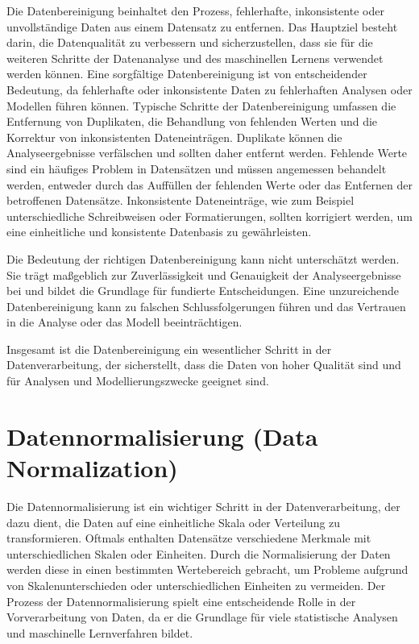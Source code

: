 Die Datenbereinigung beinhaltet den Prozess, fehlerhafte, inkonsistente oder unvollständige Daten aus einem Datensatz zu entfernen.
Das Hauptziel besteht darin, die Datenqualität zu verbessern und sicherzustellen, dass sie für die weiteren Schritte der Datenanalyse und des maschinellen Lernens verwendet werden können.
Eine sorgfältige Datenbereinigung ist von entscheidender Bedeutung, da fehlerhafte oder inkonsistente Daten zu fehlerhaften Analysen oder Modellen führen können.
Typische Schritte der Datenbereinigung umfassen die Entfernung von Duplikaten, die Behandlung von fehlenden Werten und die Korrektur von inkonsistenten Dateneinträgen.
Duplikate können die Analyseergebnisse verfälschen und sollten daher entfernt werden. 
Fehlende Werte sind ein häufiges Problem in Datensätzen und müssen angemessen behandelt werden, entweder durch das Auffüllen der fehlenden Werte oder das Entfernen der betroffenen Datensätze. 
Inkonsistente Dateneinträge, wie zum Beispiel unterschiedliche Schreibweisen oder Formatierungen, sollten korrigiert werden, um eine einheitliche und konsistente Datenbasis zu gewährleisten.  

Die Bedeutung der richtigen Datenbereinigung kann nicht unterschätzt werden. 
Sie trägt maßgeblich zur Zuverlässigkeit und Genauigkeit der Analyseergebnisse bei und bildet die Grundlage für fundierte Entscheidungen. 
Eine unzureichende Datenbereinigung kann zu falschen Schlussfolgerungen führen und das Vertrauen in die Analyse oder das Modell beeinträchtigen.    

Insgesamt ist die Datenbereinigung ein wesentlicher Schritt in der Datenverarbeitung, der sicherstellt, dass die Daten von hoher Qualität sind und für Analysen und Modellierungszwecke geeignet sind.

\section{Datennormalisierung (Data Normalization)}

Die Datennormalisierung ist ein wichtiger Schritt in der Datenverarbeitung, der dazu dient, die Daten auf eine einheitliche Skala oder Verteilung zu transformieren. 
Oftmals enthalten Datensätze verschiedene Merkmale mit unterschiedlichen Skalen oder Einheiten. 
Durch die Normalisierung der Daten werden diese in einen bestimmten Wertebereich gebracht, um Probleme aufgrund von Skalenunterschieden oder unterschiedlichen Einheiten zu vermeiden.
Der Prozess der Datennormalisierung spielt eine entscheidende Rolle in der Vorverarbeitung von Daten, da er die Grundlage für viele statistische Analysen und maschinelle Lernverfahren bildet.


